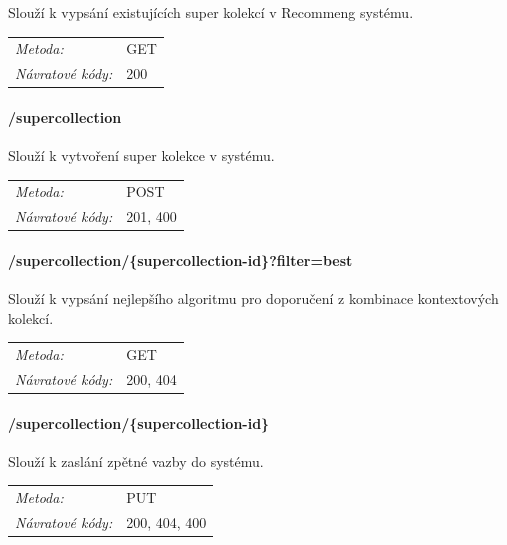 \documentclass[thesis=M,czech]{FITthesis}[2014/05/07]
\begin{document}
Slouží k vypsání existujících super kolekcí v Recommeng systému.

\begin{center}
 	\begin{tabular}{lp{10cm}}
 		\textit{Metoda:}		& GET			\tabularnewline 
 		\textit{Návratové kódy:}		& 200			\tabularnewline 		
 	\end{tabular}	
\end{center} 

\paragraph*{/supercollection}

Slouží k vytvoření super kolekce v systému.

\begin{center}
 	\begin{tabular}{lp{10cm}}
 		\textit{Metoda:}		& POST			\tabularnewline 
 		\textit{Návratové kódy:}		& 201, 400			\tabularnewline 		
 	\end{tabular}	
\end{center} 

\paragraph*{/supercollection/\{supercollection-id\}?filter=best}

Slouží k vypsání nejlepšího algoritmu pro doporučení z kombinace kontextových kolekcí.

\begin{center}
 	\begin{tabular}{lp{10cm}}
 		\textit{Metoda:}		& GET			\tabularnewline 
 		\textit{Návratové kódy:}		& 200, 404			\tabularnewline 		
 	\end{tabular}	
\end{center} 

\paragraph*{/supercollection/\{supercollection-id\}}

Slouží k zaslání zpětné vazby do systému.

\begin{center}
 	\begin{tabular}{lp{10cm}}
 		\textit{Metoda:}		& PUT			\tabularnewline 
 		\textit{Návratové kódy:}		& 200, 404, 400			\tabularnewline 		
 	\end{tabular}	
\end{center} 
\end{document}
